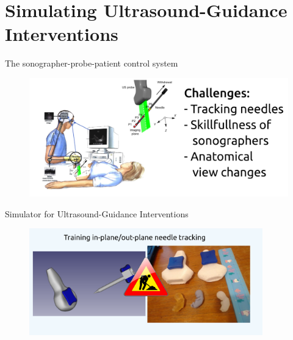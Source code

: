 \section{Simulating Ultrasound-Guidance Interventions}


{
\begin{frame}{The sonographer-probe-patient control system}
      \begin{figure}
        \centering
        \includegraphics[width=1.0\textwidth]{./figures/sonographer-probe-patient/versions/drawing-v01.png}
      \end{figure}
\end{frame}
}


{
\begin{frame}{Simulator for Ultrasound-Guidance Interventions}
      \begin{figure}
        \centering
        \includegraphics[width=0.9\textwidth]{./figures/sugi/simulator/versions/drawing-v00.png}
      \end{figure}
\end{frame}
}



